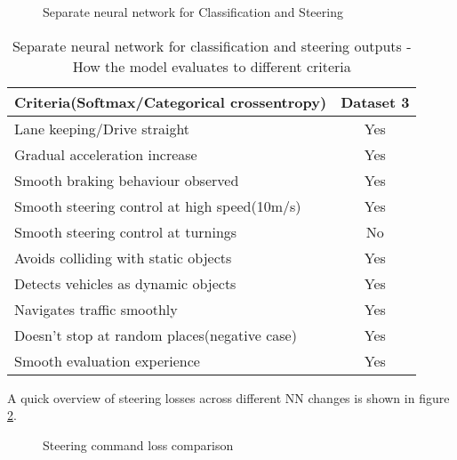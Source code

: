 \begin{figure}[!ht]
	\centering
    \def\svgwidth{0.8\textwidth}
    \caption{Separate neural network for Classification and Steering}
    \label{fig:ds3categoricalcrossentropy2nn}
\end{figure}
\begin{table}[!ht]
    \centering
\begin{tabular}{lc}
    \toprule
    Criteria(Softmax/Categorical crossentropy)  & Dataset 3 \\\midrule
    Lane keeping/Drive straight  & Yes  \\
    Gradual acceleration increase  & Yes\\
    Smooth braking behaviour observed & Yes \\
    Smooth steering control at high speed(10m/s) & Yes \\
    Smooth steering control at turnings & No\\
    Avoids colliding with static objects & Yes \\
    Detects vehicles as dynamic objects & Yes \\
    Navigates traffic smoothly & Yes\\
    Doesn't stop at random places(negative case) & Yes \\
    Smooth evaluation experience & Yes \\\bottomrule
\end{tabular}
\caption{Separate neural network for classification and steering outputs - How the model evaluates to different criteria}
\label{table:cce2NN}
\end{table}

A quick overview of steering losses across different NN changes is shown in figure
 \ref{fig:ds3categoricalcrossentropysteeringcompare}.
 \begin{figure}[!ht]
	\centering
    \def\svgwidth{\textwidth}
    \caption{Steering command loss comparison}
    \label{fig:ds3categoricalcrossentropysteeringcompare}
\end{figure}
\newpage \vfill
